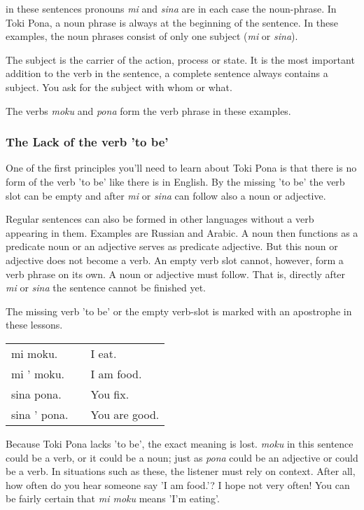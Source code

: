 in these sentences pronouns \textit{mi} and \textit{sina} are in each case the noun-phrase. 
In Toki Pona, a noun phrase is always at the beginning of the sentence. 
In these examples, the noun phrases consist of only one subject (\textit{mi} or \textit{sina}).

The subject is the carrier of the action, process or state. 
It is the most important addition to the verb in the sentence, a complete sentence always contains a subject. 
You ask for the subject with whom or what.

The verbs \textit{moku} and \textit{pona} form the verb phrase in these examples.  
%
\newpage
\subsubsection*{The Lack of the verb 'to be'}
%
One of the first principles you'll need to learn about Toki Pona is that there is no form of the verb 'to be' like there is in English. 
By the missing 'to be' the verb slot can be empty and after \textit{mi} or \textit{sina} can follow also a noun or adjective. 

Regular sentences can also be formed in other languages without a verb appearing in them. 
Examples are Russian and Arabic. 
A noun then functions as a predicate noun or an adjective serves as predicate adjective.
But this noun or adjective does not become a verb. 
An empty verb slot cannot, however, form a verb phrase on its own. 
A noun or adjective must follow. 
That is, directly after \textit{mi} or \textit{sina} the sentence cannot be finished yet.

The missing verb 'to be' or the empty verb-slot is marked with an apostrophe in these lessons. 

\begin{supertabular}{p{5cm}|ll}
mi moku. && I eat.  \\
mi ' moku. && I am food. \\  
sina pona. && You fix. \\
sina ' pona. && You are good. \\  
\end{supertabular} 

Because Toki Pona lacks 'to be', the exact meaning is lost. 
\textit{moku} in this sentence could be a verb, or it could be a noun; just as \textit{pona} could be an adjective or could be a verb. 
In situations such as these, the listener must rely on context. 
After all, how often do you hear someone say 'I am food.'? 
I hope not very often! You can be fairly certain that \textit{mi moku} means 'I'm eating'. 
%
